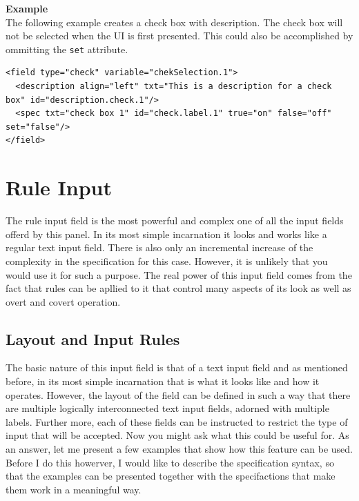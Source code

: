 \textbf{Example}\\

The following example creates a check box with description. The check
box will not be selected when the UI is first presented. This could also
be accomplished by ommitting the \texttt{set} attribute.\\

\footnotesize
\begin{verbatim}
<field type="check" variable="chekSelection.1">
  <description align="left" txt="This is a description for a check box" id="description.check.1"/>
  <spec txt="check box 1" id="check.label.1" true="on" false="off" set="false"/>
</field>
\end{verbatim}
\normalsize

\section{Rule Input}

The rule input field is the most powerful and complex one of all the
input fields offerd by this panel. In its most simple incarnation it
looks and works like a regular text input field. There is also only an
incremental increase of the complexity in the specification for this
case. However, it is unlikely that you would use it for such a purpose.
The real power of this input field comes from the fact that rules can be
apllied to it that control many aspects of its look as well as overt and
covert operation.\\

\subsection{Layout and Input Rules}

The basic nature of this input field is that of a text input field and
as mentioned before, in its most simple incarnation that is what it
looks like and how it operates. However, the layout of the field can be
defined in such a way that there are multiple logically interconnected
text input fields, adorned with multiple labels. Further more, each of
these fields can be instructed to restrict the type of input that will
be accepted. Now you might ask what this could be useful for. As an
answer, let me present a few examples that show how this feature can be
used. Before I do this howerver, I would like to describe the
specification syntax, so that the examples can be presented together
with the specifactions that make them work in a meaningful way.\\

